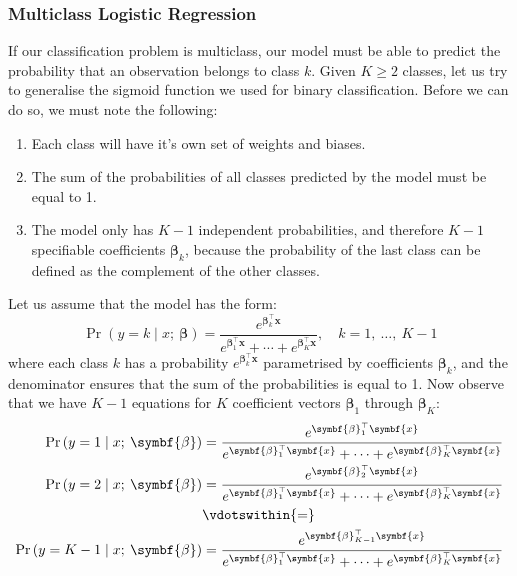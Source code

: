 \documentclass{article}
\begin{document}
\subsubsection{Multiclass Logistic Regression}
If our classification problem is multiclass, our model must be able to
predict the probability that an observation belongs to class \(k\).
Given \(K \geqslant 2\) classes, let us try to generalise the sigmoid
function we used for binary classification. Before we can do so, we
must note the following:
\begin{enumerate}
    \item Each class will have it's own set of weights and biases.
    \item The sum of the probabilities of all classes predicted by the
          model must be equal to 1.
    \item The model only has \(K - 1\) independent probabilities, and
          therefore \(K - 1\) specifiable coefficients
          \(\symbf{\beta}_k\), because the probability of the last
          class can be defined as the complement of the other classes.
\end{enumerate}
Let us assume that the model has the form:
\begin{equation*}
    \Pr{\left( y = k \mid x;\: \symbf{\beta} \right)} = \frac{e^{\symbf{\beta}_k^\top \symbf{x}}}{e^{\symbf{\beta}_1^\top \symbf{x}} + \cdots + e^{\symbf{\beta}_K^\top \symbf{x}}}, \quad k = 1,\: \dots,\: K - 1
\end{equation*}
where each class \(k\) has a probability \(e^{\symbf{\beta}_k^\top \symbf{x}}\)
parametrised by coefficients \(\symbf{\beta}_k\), and the denominator
ensures that the sum of the probabilities is equal to 1. Now observe
that we have \(K-1\) equations for \(K\) coefficient vectors
\(\symbf{\beta}_1\) through \(\symbf{\beta}_K\):
\begin{align*}
    \Pr{\left( y = 1 \mid x;\: \symbf{\beta} \right)}   & = \frac{e^{\symbf{\beta}_1^\top \symbf{x}}}{e^{\symbf{\beta}_1^\top \symbf{x}} + \cdots + e^{\symbf{\beta}_K^\top \symbf{x}}}     \\
    \Pr{\left( y = 2 \mid x;\: \symbf{\beta} \right)}   & = \frac{e^{\symbf{\beta}_2^\top \symbf{x}}}{e^{\symbf{\beta}_1^\top \symbf{x}} + \cdots + e^{\symbf{\beta}_K^\top \symbf{x}}}     \\
                                                        & \vdotswithin{=}                                                                                                                   \\
    \Pr{\left( y = K-1 \mid x;\: \symbf{\beta} \right)} & = \frac{e^{\symbf{\beta}_{K-1}^\top \symbf{x}}}{e^{\symbf{\beta}_1^\top \symbf{x}} + \cdots + e^{\symbf{\beta}_K^\top \symbf{x}}}
\end{align*}
\end{document}
